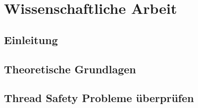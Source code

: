 \documentclass[ openright,titlepage,numbers=noenddot,headinclude,%
                footinclude=true,cleardoublepage=empty,abstractoff, %
                BCOR=5mm,paper=a4,fontsize=11pt,%
                ngerman,american,%
                ]{scrreprt}
\begin{document}
\frenchspacing
\raggedbottom
{} %
\pagestyle{plain}


\cleardoublepage
\cleardoublepage
\cleardoublepage
\cleardoublepage
\cleardoublepage
\cleardoublepage
\cleardoublepage
\cleardoublepage
\pagestyle{scrheadings}
\cleardoublepage
\part{Wissenschaftliche Arbeit}\label{pt:thesis}

\chapter{Einleitung}






\chapter{Theoretische Grundlagen}



\chapter{Thread Safety Probleme überprüfen}



\end{document}
